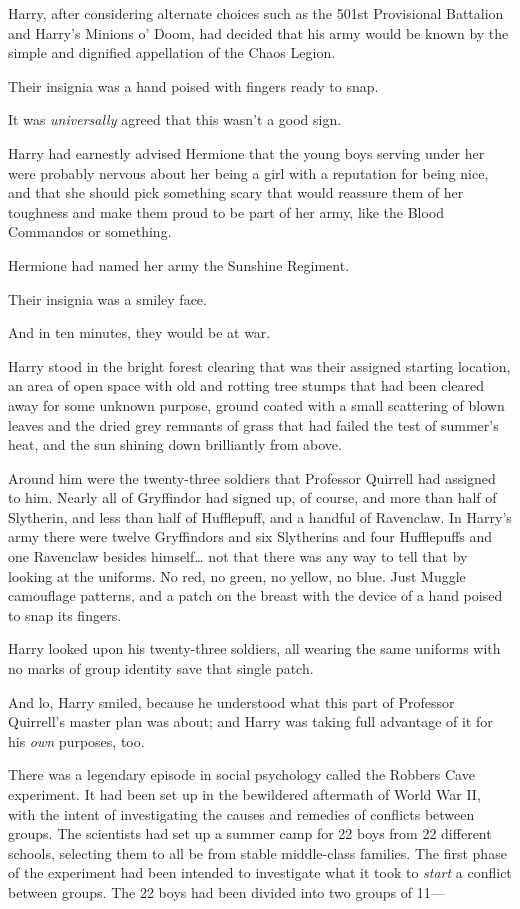 Harry, after considering alternate choices such as the 501st Provisional 
Battalion and Harry's Minions o' Doom, had decided that his army would be known 
by the simple and dignified appellation of the Chaos Legion.

Their insignia was a hand poised with fingers ready to snap.

It was \emph{universally} agreed that this wasn't a good sign.

Harry had earnestly advised Hermione that the young boys serving under her were 
probably nervous about her being a girl with a reputation for being nice, and 
that she should pick something scary that would reassure them of her toughness 
and make them proud to be part of her army, like the Blood Commandos or 
something.

Hermione had named her army the Sunshine Regiment.

Their insignia was a smiley face.

And in ten minutes, they would be at war.

Harry stood in the bright forest clearing that was their assigned starting 
location, an area of open space with old and rotting tree stumps that had been 
cleared away for some unknown purpose, ground coated with a small scattering of 
blown leaves and the dried grey remnants of grass that had failed the test of 
summer's heat, and the sun shining down brilliantly from above.

Around him were the twenty-three soldiers that Professor Quirrell had assigned 
to him. Nearly all of Gryffindor had signed up, of course, and more than half 
of Slytherin, and less than half of Hufflepuff, and a handful of Ravenclaw. In 
Harry's army there were twelve Gryffindors and six Slytherins and four 
Hufflepuffs and one Ravenclaw besides himself{\ldots} not that there was any 
way to tell that by looking at the uniforms. No red, no green, no yellow, no 
blue. Just Muggle camouflage patterns, and a patch on the breast with the 
device of a hand poised to snap its fingers.

Harry looked upon his twenty-three soldiers, all wearing the same uniforms with 
no marks of group identity save that single patch.

And lo, Harry smiled, because he understood what this part of Professor 
Quirrell's master plan was about; and Harry was taking full advantage of it for 
his \emph{own} purposes, too.

There was a legendary episode in social psychology called the Robbers Cave 
experiment. It had been set up in the bewildered aftermath of World War II, 
with the intent of investigating the causes and remedies of conflicts between 
groups. The scientists had set up a summer camp for 22 boys from 22 different 
schools, selecting them to all be from stable middle-class families. The first 
phase of the experiment had been intended to investigate what it took to 
\emph{start} a conflict between groups. The 22 boys had been divided into two 
groups of 11---

